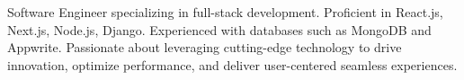 

Software Engineer specializing in full-stack development. Proficient in React.js, Next.js, Node.js, Django. Experienced with databases such as MongoDB and Appwrite.
Passionate about leveraging cutting-edge technology to drive innovation, optimize performance, and deliver user-centered seamless experiences.


